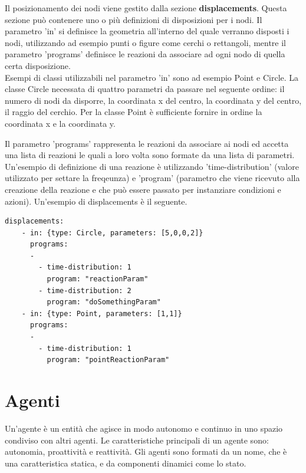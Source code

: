 \documentclass[12pt,a4paper,openright,twoside]{report}
\begin{document}
Il posizionamento dei nodi viene gestito dalla sezione \textbf{displacements}. Questa sezione pu\`o contenere uno o pi\`u definizioni di disposizioni per i nodi.
Il parametro 'in' si definisce la geometria all'interno del quale verranno disposti i nodi, utilizzando ad esempio punti o figure come cerchi o rettangoli, mentre il parametro 'programs' definisce le reazioni da associare ad ogni nodo di quella certa disposizione.
\\
Esempi di classi utilizzabili nel parametro 'in' sono ad esempio Point e Circle.
La classe Circle necessata di quattro parametri da passare nel seguente ordine: il numero di nodi da disporre, la coordinata x del centro, la coordinata y del centro, il raggio del cerchio. Per la classe Point \`e sufficiente fornire in ordine la coordinata x e la coordinata y.

Il parametro 'programs' rappresenta le reazioni da associare ai nodi ed accetta una lista di reazioni le quali a loro volta sono formate da una lista di parametri. Un'esempio di definizione di una reazione \`e utilizzando 'time-distribution' (valore utilizzato per settare la freqeunza) e 'program' (parametro che viene ricevuto alla creazione della reazione e che pu\`o essere passato per instanziare condizioni e azioni).
Un'esempio di displacements \`e il seguente.
\medskip
\begin{lstlisting}[firstnumber=last,caption={Disposizione nodi e reazioni associate}]
  displacements:
    - in: {type: Circle, parameters: [5,0,0,2]}
      programs:
      -
        - time-distribution: 1
          program: "reactionParam"
        - time-distribution: 2
          program: "doSomethingParam"
    - in: {type: Point, parameters: [1,1]}
      programs:
      -
        - time-distribution: 1
          program: "pointReactionParam"
\end{lstlisting}


\chapter{Agenti}
\lhead[\fancyplain{}{\bfseries\thepage}]{\fancyplain{}{\bfseries\rightmark}}

Un'agente \`e un entit\`a che agisce in modo autonomo e continuo in uno spazio condiviso con altri agenti. Le caratteristiche principali di un agente sono: autonomia, proattivit\`a e reattivit\`a. Gli agenti sono formati da un nome, che \`e una caratteristica statica, e da componenti dinamici come lo stato.
\end{document}
